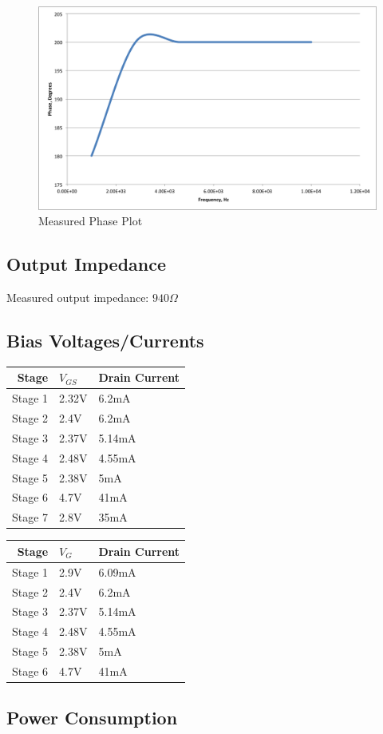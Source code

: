 \documentclass[11pt, twoside, letterpaper]{article}
\begin{document}
\begin{figure}[htbp]
\begin{center}
\includegraphics[width=7in]{measuredphase.png}
\caption{Measured Phase Plot}
\end{center}
\end{figure}
\FloatBarrier

\subsection*{Output Impedance}
Measured output impedance: $940 \Omega$
\subsection*{Bias Voltages/Currents}
\begin{tabular}{|r|l|l|}
\hline
Stage & $V_{GS}$ & Drain Current\\
\hline
Stage 1 &2.32V&6.2mA\\
Stage 2 &2.4V&6.2mA\\
Stage 3 &2.37V&5.14mA\\
Stage 4 &2.48V&4.55mA\\
Stage 5 &2.38V&5mA\\%
Stage 6 &4.7V&41mA\\
Stage 7 &2.8V&35mA\\
\hline
\end{tabular}

\begin{tabular}{|r|l|l|}
\hline
Stage & $V_{G}$ & Drain Current\\
\hline
Stage 1 &2.9V&6.09mA\\
Stage 2 &2.4V&6.2mA\\
Stage 3 &2.37V&5.14mA\\
Stage 4 &2.48V&4.55mA\\
Stage 5 &2.38V&5mA\\
Stage 6 &4.7V&41mA\\
\hline
\end{tabular}


\subsection*{Power Consumption}
\end{document}
